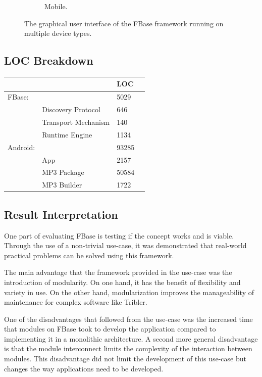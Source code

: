 \begin{figure}[h!]
\begin{subfigure}[t]{.31\textwidth}
		\caption{Mobile.}
		\label{fig:plugin}
	\end{subfigure}\vspace{0.5cm}\hfill%
	\caption{The graphical user interface of the FBase framework running on multiple device types.}
	\label{fig:evolution}
\end{figure}

\newpage
		
\subsection{LOC Breakdown}

\begin{table}[ht!]
	\begin{tabular}{@{}llll@{}}
		\toprule
		&           & LOC    \\ \midrule
		FBase:   &           &        5029     \\
		& Discovery Protocol & 646    \\
		& Transport Mechanism& 140   \\
		& Runtime Engine    & 1134     \\
		Android: &           &  93285           \\
		& App       & 2157  \\ 
		& MP3 Package& 50584\\
		& MP3 Builder & 1722 \\ \bottomrule
	\end{tabular}
\end{table}

\subsection{Result Interpretation}

One part of evaluating FBase is testing if the concept works and is viable. Through the use of a non-trivial use-case, it was demonstrated that real-world practical problems can be solved using this framework.

The main advantage that the framework provided in the use-case was the introduction of modularity. On one hand, it has the benefit of flexibility and variety in use. On the other hand, modularization improves the manageability of maintenance for complex software like Tribler.

One of the disadvantages that followed from the use-case was the increased time that modules on FBase took to develop the application compared to implementing it in a monolithic architecture. A second more general disadvantage is that the module interconnect limits the complexity of the interaction between modules. This disadvantage did not limit the development of this use-case but changes the way applications need to be developed.

